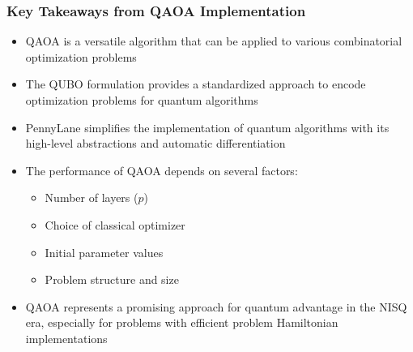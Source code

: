 \vspace{0.3cm}


\subsubsection*{Key Takeaways from QAOA Implementation}

\begin{itemize}
  \item QAOA is a versatile algorithm that can be applied to various
    combinatorial optimization problems

  \item The QUBO formulation provides a standardized approach to encode
    optimization problems for quantum algorithms

  \item PennyLane simplifies the implementation of quantum algorithms with
    its high-level abstractions and automatic differentiation

  \item The performance of QAOA depends on several factors:
    \begin{itemize}
      \item Number of layers ($p$)

      \item Choice of classical optimizer

      \item Initial parameter values

      \item Problem structure and size
    \end{itemize}

  \item QAOA represents a promising approach for quantum advantage in the
    NISQ era, especially for problems with efficient problem Hamiltonian
    implementations
\end{itemize}


